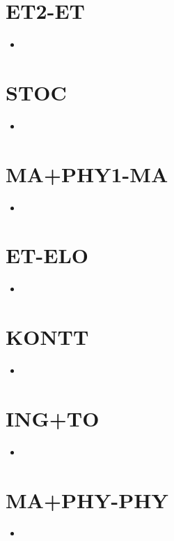 \section{ET2-ET}
\begin{itemize}
  \item 
\end{itemize}

\section{STOC}
\begin{itemize}
  \item 
\end{itemize}

\section{MA+PHY1-MA}
\begin{itemize}
  \item 
\end{itemize}

\section{ET-ELO}
\begin{itemize}
  \item 
\end{itemize}

\section{KONTT}
\begin{itemize}
  \item 
\end{itemize}

\section{ING+TO}
\begin{itemize}
  \item 
\end{itemize}

\section{MA+PHY-PHY}
\begin{itemize}
  \item 
\end{itemize}

